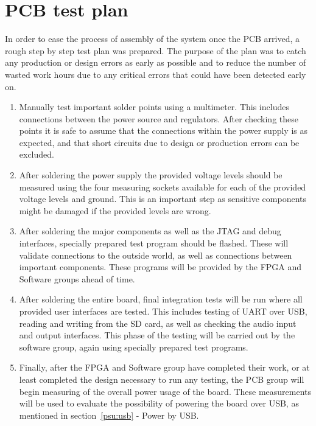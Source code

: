 
\section{PCB test plan}

In order to ease the process of assembly of the system once the PCB arrived, a
rough step by step test plan was prepared. The purpose of the plan was to catch
any production or design errors as early as possible and to reduce the number of
wasted work hours due to any critical errors that could have been detected early
on.

\begin{enumerate}
    \item Manually test important solder points using a multimeter. This 
    includes connections between the power source and regulators. After 
    checking these points it is safe to assume that the connections within
    the power supply is as expected, and that short circuits due to design
    or production errors can be excluded.
    \item After soldering the power supply the provided voltage levels should
    be measured using the four measuring sockets available for each of the
    provided voltage levels and ground. This is an important step as sensitive
    components might be damaged if the provided levels are wrong. 
    \item After soldering the major components as well as the JTAG and debug
    interfaces, specially prepared test program should be flashed. These will
    validate connections to the outside world, as well as connections between 
    important components. These programs will be provided by the FPGA and 
    Software groups ahead of time.
    \item After soldering the entire board, final integration tests will be run where all
    provided user interfaces are tested. This includes testing of UART over 
    USB, reading and writing from the SD card, as well as checking the audio input and output interfaces. This phase of 
    the testing will be carried out by the software group, again using specially
    prepared test programs.
    \item Finally, after the FPGA and Software group have completed their work,
    or at least completed the design necessary to run any testing, the PCB group
    will begin measuring of the overall power usage of the board. These measurements
    will be used to evaluate the possibility of powering the board over USB, as 
    mentioned in section~\ref{psu:usb} - Power by USB.
\end{enumerate}

